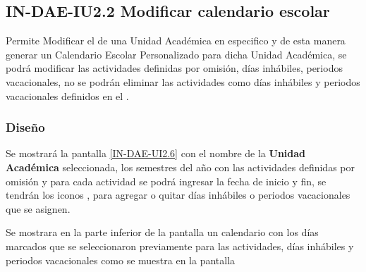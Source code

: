 \subsection{IN-DAE-IU2.2 Modificar calendario escolar}

	Permite Modificar el  de una Unidad Académica en especifico y de esta manera generar un Calendario Escolar Personalizado para dicha Unidad Académica, se podrá modificar las actividades definidas por omisión, días inhábiles, periodos vacacionales, no se podrán eliminar las actividades como días inhábiles y periodos vacacionales definidos en el .\\		

\subsubsection{Diseño}

Se mostrará la pantalla \ref{IN-DAE-UI2.6} con el nombre de la \textbf{Unidad Académica} seleccionada, los semestres del año con las actividades definidas por omisión y para cada actividad se podrá ingresar la fecha de inicio y fin, se tendrán los iconos \IUAdd, \IUMenos para agregar o quitar días inhábiles o periodos vacacionales que se asignen.



Se mostrara en la parte inferior de la pantalla un calendario con los días marcados que se seleccionaron previamente para las actividades, días inhábiles y periodos vacacionales como se muestra en la pantalla 





